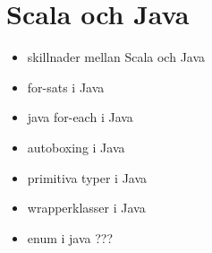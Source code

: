 \chapter{Scala och Java}\label{chapter:W11}
\begin{itemize}[nosep]
\item skillnader mellan Scala och Java
\item for-sats i Java
\item java for-each i Java
\item autoboxing i Java
\item primitiva typer i Java
\item wrapperklasser i Java
\item enum i java ???
\end{itemize}